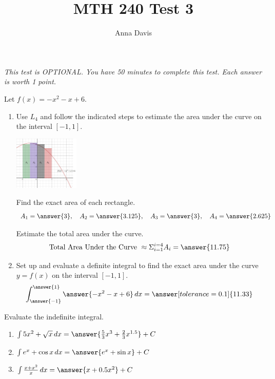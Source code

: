 \documentclass{ximera}
\author{Anna Davis} \title{MTH 240 Test 3}
\begin{document}
\begin{abstract}

\end{abstract}
\maketitle
 \textit{This test is OPTIONAL.  You have 50 minutes to complete this test.  Each answer is worth 1 point.}
\begin{problem}\label{prob:mth240exam3prob1}
Let $f(x)=-x^2-x+6$.  
\begin{enumerate}
\item Use $L_4$ and follow the indicated steps to estimate the area under the curve on the interval $[-1,1]$.  
\begin{image}
   
\includegraphics[height=1in]{240test3image1.jpg}

\end{image}
Find the exact area of each rectangle.
$$A_1=\answer{3},\quad A_2=\answer{3.125},\quad A_3=\answer{3},\quad A_4=\answer{2.625}$$

Estimate the total area under the curve.
$$\mbox{Total Area Under the Curve }\approx \Sigma_{i=1}^{i=4}A_i=\answer{11.75}$$
\item
Set up and evaluate a definite integral to find the exact area under the curve $y=f(x)$ on the interval $[-1,1]$.
$$\int_{\answer{-1}}^{\answer{1}}\answer{-x^2-x+6}\,dx=\answer[tolerance=0.1]{11.33}$$
\end{enumerate}
\end{problem}

\begin{problem}\label{prob:mth240exam3prob2}
Evaluate the indefinite integral.
  \begin{enumerate}
\item
$\int 5x^2+\sqrt{x}\,dx=\answer{\frac{5}{3}x^3+\frac{2}{3}x^{1.5}}+C$

\item
$\int e^x+\cos x\, dx=\answer{e^x+\sin x}+C$

\item
$\int \frac{x+x^2}{x}\,dx=\answer{x+0.5x^2}+C$
  \end{enumerate}
\end{problem}
\end{document}
